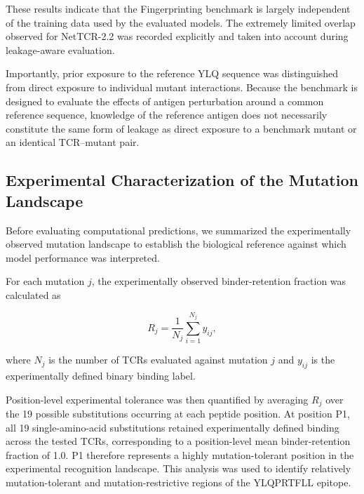 \documentclass{article}
\begin{document}
These results indicate that the Fingerprinting benchmark is largely
independent of the training data used by the evaluated models. The extremely
limited overlap observed for NetTCR-2.2 was recorded explicitly and taken
into account during leakage-aware evaluation.

Importantly, prior exposure to the reference YLQ sequence was distinguished
from direct exposure to individual mutant interactions. Because the benchmark
is designed to evaluate the effects of antigen perturbation around a common
reference sequence, knowledge of the reference antigen does not necessarily
constitute the same form of leakage as direct exposure to a benchmark mutant
or an identical TCR--mutant pair.

\begin{table}[t]
\small
\centering
\caption{
Training--benchmark overlap between the Fingerprinting dataset and the
training data used by the evaluated prediction models.
}
\label{tab:leakage}
%
\end{table}

\subsection{Experimental Characterization of the Mutation Landscape}

Before evaluating computational predictions, we summarized the experimentally
observed mutation landscape to establish the biological reference against
which model performance was interpreted. 

For each mutation $j$, the experimentally observed binder-retention fraction
was calculated as

\begin{equation}
R_j
=
\frac{1}{N_j}
\sum_{i=1}^{N_j} y_{ij},
\label{eq:binder_fraction}
\end{equation}

where $N_j$ is the number of TCRs evaluated against mutation $j$ and
$y_{ij}$ is the experimentally defined binary binding label.

Position-level experimental tolerance was then quantified by averaging
$R_j$ over the 19 possible substitutions occurring at each peptide
position. At position P1, all 19 single-amino-acid substitutions retained experimentally defined
binding across the tested TCRs, corresponding to a position-level mean
binder-retention fraction of 1.0. P1 therefore represents a highly
mutation-tolerant position in the experimental recognition landscape. 
This analysis was used to identify relatively mutation-tolerant
and mutation-restrictive regions of the YLQPRTFLL epitope.
\end{document}
